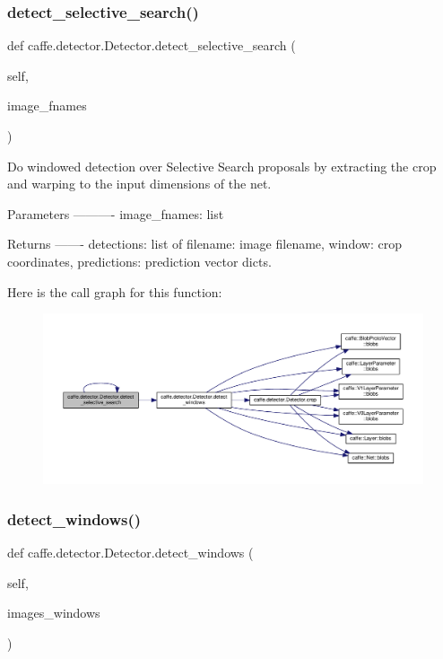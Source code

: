 \subsubsection{\texorpdfstring{detect\+\_\+selective\+\_\+search()}{detect\_selective\_search()}\hspace{0.1cm}{\footnotesize\ttfamily [2/2]}}
{\footnotesize\ttfamily def caffe.\+detector.\+Detector.\+detect\+\_\+selective\+\_\+search (\begin{DoxyParamCaption}\item[{}]{self,  }\item[{}]{image\+\_\+fnames }\end{DoxyParamCaption})}

\begin{DoxyVerb}Do windowed detection over Selective Search proposals by extracting
the crop and warping to the input dimensions of the net.

Parameters
----------
image_fnames: list

Returns
-------
detections: list of {filename: image filename, window: crop coordinates,
    predictions: prediction vector} dicts.
\end{DoxyVerb}
 Here is the call graph for this function\+:
\nopagebreak
\begin{figure}[H]
\begin{center}
\leavevmode
\includegraphics[width=350pt]{classcaffe_1_1detector_1_1_detector_a2d96c53701abd37152c5f078a18ebf08_cgraph}
\end{center}
\end{figure}
\mbox{\label{classcaffe_1_1detector_1_1_detector_a7ddd403050bacd8fcccc62705f2405ff}} 
\subsubsection{\texorpdfstring{detect\+\_\+windows()}{detect\_windows()}\hspace{0.1cm}{\footnotesize\ttfamily [1/2]}}
{\footnotesize\ttfamily def caffe.\+detector.\+Detector.\+detect\+\_\+windows (\begin{DoxyParamCaption}\item[{}]{self,  }\item[{}]{images\+\_\+windows }\end{DoxyParamCaption})}

